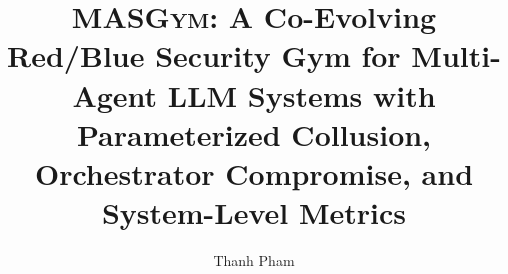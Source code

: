 \documentclass[preprint,12pt]{elsarticle}
\theoremstyle{plain}
\theoremstyle{definition}
\theoremstyle{remark}
\newcommand{\defname}{\textsc{MASGym}\xspace}
\begin{document}
\begin{frontmatter}

\title{\defname: A Co-Evolving Red/Blue Security Gym for Multi-Agent LLM
Systems with Parameterized Collusion, Orchestrator Compromise, and
System-Level Metrics}

\author[rmit]{Thanh Pham}
\address[rmit]{School of Computing Technologies, RMIT University, Melbourne, Australia}



\end{frontmatter}






















\appendix




\end{document}

